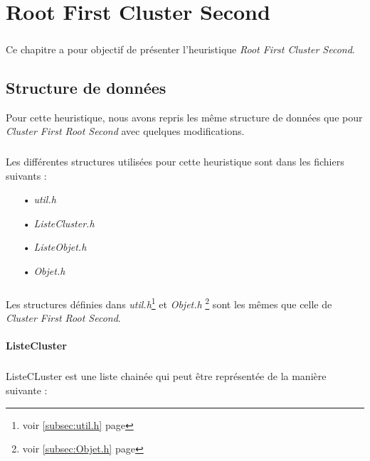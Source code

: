 \documentclass[twoside,UTF8]{EPURapport}
\begin{document}

\chapter{Root First Cluster Second}

\paragraph{}
Ce chapitre a pour objectif de présenter l'heuristique \textit{Root First Cluster Second}.

\section{Structure de données}

Pour cette heuristique, nous avons repris les même structure de données que pour \textit{Cluster First Root Second} avec quelques modifications.

\paragraph{}
Les différentes structures utilisées pour cette heuristique sont dans les fichiers suivants :
\begin{itemize}
	\item[•]\textit{util.h}
	\item[•]\textit{ListeCluster.h}
	\item[•]\textit{ListeObjet.h}
	\item[•]\textit{Objet.h}
\end{itemize}

\paragraph{}
Les structures définies dans \textit{util.h}\footnote{voir \ref{subsec:util.h} page \pageref{subsec:util.h}} et \textit{Objet.h} \footnote{voir \ref{subsec:Objet.h} page \pageref{subsec:Objet.h}} sont les mêmes que celle de \textit{Cluster First Root Second}. 

\subsubsection{ListeCluster}

\paragraph{}
ListeCLuster est une liste chainée qui peut être représentée de la manière suivante : 
\end{document}

